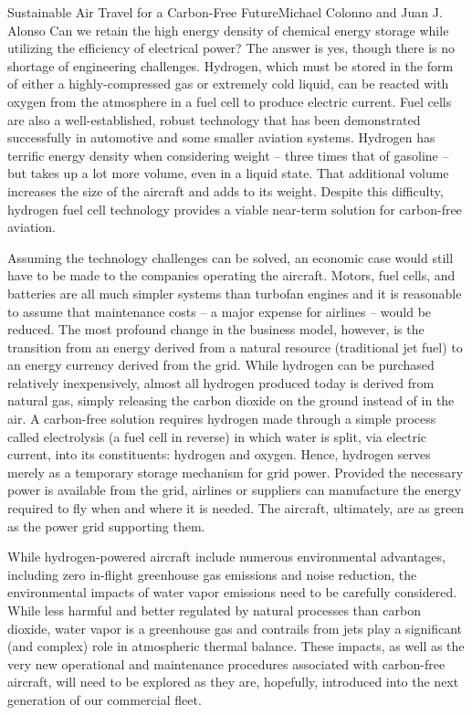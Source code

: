 \documentclass{papertex}
\begin{document}
\begin{news}{2}{Sustainable Air Travel for a Carbon-Free Future}{Michael Colonno and Juan J. Alonso}{}{}
Can we retain the high energy density of chemical energy storage while 
utilizing the efficiency of electrical power? The answer is yes, though there 
is no shortage of engineering challenges. Hydrogen, which must be stored in 
the form of either a highly-compressed gas or extremely cold liquid, can be 
reacted with oxygen from the atmosphere in a fuel cell to produce electric 
current. Fuel cells are also a well-established, robust technology that has 
been demonstrated successfully in automotive and some smaller aviation systems. 
Hydrogen has terrific energy density when considering weight – three times 
that of gasoline – but takes up a lot more volume, even in a liquid state. 
That additional volume increases the size of the aircraft and adds to its 
weight. Despite this difficulty, hydrogen fuel cell technology provides a 
viable near-term solution for carbon-free aviation.

Assuming the technology challenges can be solved, an economic case would 
still have to be made to the companies operating the aircraft. Motors, fuel 
cells, and batteries are all much simpler systems than turbofan engines and 
it is reasonable to assume that maintenance costs – a major expense for 
airlines – would be reduced. The most profound change in the business model, 
however, is the transition from an energy derived from a natural resource 
(traditional jet fuel) to an energy currency derived from the grid. While 
hydrogen can be purchased relatively inexpensively, almost all hydrogen 
produced today is derived from natural gas, simply releasing the carbon 
dioxide on the ground instead of in the air. A carbon-free solution requires 
hydrogen made through a simple process called electrolysis (a fuel cell in 
reverse) in which water is split, via electric current, into its constituents: 
hydrogen and oxygen. Hence, hydrogen serves merely as a temporary storage 
mechanism for grid power. Provided the necessary power is available from the 
grid, airlines or suppliers can manufacture the energy required to fly when 
and where it is needed. The aircraft, ultimately, are as green as the power 
grid supporting them.

While hydrogen-powered aircraft include numerous environmental advantages, 
including zero in-flight greenhouse gas emissions and noise reduction, the 
environmental impacts of water vapor emissions need to be carefully considered. 
While less harmful and better regulated by natural processes than carbon 
dioxide, water vapor is a greenhouse gas and contrails from jets play a 
significant (and complex) role in atmospheric thermal balance. These impacts, 
as well as the very new operational and maintenance procedures associated 
with carbon-free aircraft, will need to be explored as they are, hopefully, 
introduced into the next generation of our commercial fleet.


\end{news}
\end{document}
